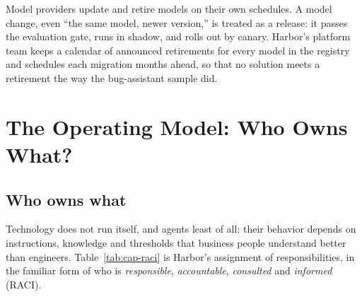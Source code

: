 Model providers update and retire models on their own schedules. A model change, even ``the same model, newer version,'' is treated as a release: it passes the evaluation gate, runs in shadow, and rolls out by canary. Harbor's platform team keeps a calendar of announced retirements for every model in the registry and schedules each migration months ahead, so that no solution meets a retirement the way the bug-assistant sample did.

\section{The Operating Model: Who Owns What?}
\label{sec:cap-operating}

\subsection{Who owns what}

Technology does not run itself, and agents least of all: their behavior depends on instructions, knowledge and thresholds that business people understand better than engineers. Table~\ref{tab:cap-raci} is Harbor's assignment of responsibilities, in the familiar form of who is \emph{responsible}, \emph{accountable}, \emph{consulted} and \emph{informed} (RACI).

